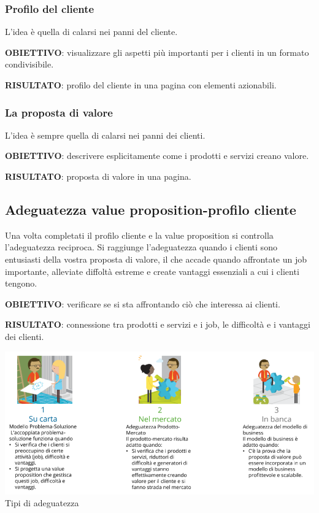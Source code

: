 \documentclass[14pt]{extarticle}
\begin{document}
\newpage
\subsubsection{Profilo del cliente}

L'idea è quella di calarsi nei panni del cliente.

\textbf{OBIETTIVO}: visualizzare gli aspetti più importanti per i clienti in un
formato condivisibile.

\textbf{RISULTATO}: profilo del cliente in una pagina con elementi azionabili.

\subsubsection{La proposta di valore}

L'idea è sempre quella di calarsi nei panni dei clienti.

\textbf{OBIETTIVO}: descrivere esplicitamente come i prodotti e servizi creano
valore.

\textbf{RISULTATO}: proposta di valore in una pagina.

\newpage
\subsection{Adeguatezza value proposition-profilo cliente}

Una volta completati il profilo cliente e la value proposition si controlla
l'adeguatezza reciproca. Si raggiunge l'adeguatezza quando i clienti sono
entusiasti della vostra proposta di valore, il che accade quando affrontate un
job importante, alleviate diffoltà estreme e create vantaggi essenziali a cui i
clienti tengono.

\textbf{OBIETTIVO}: verificare se si sta affrontando ciò che interessa ai
clienti.

\textbf{RISULTATO}: connessione tra prodotti e servizi e i job, le difficoltà e
i vantaggi dei clienti.

\begin{center}
    \includegraphics[scale=0.60]{images/adeguatezza.png}
    Tipi di adeguatezza
\end{center}
\end{document}
